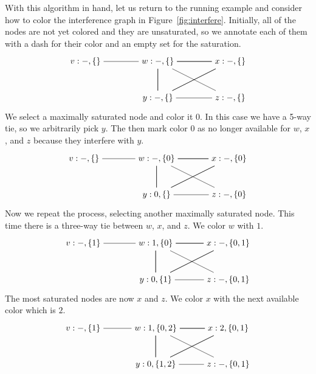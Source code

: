 \documentclass[11pt]{book}
\begin{document}
With this algorithm in hand, let us return to the running example and
consider how to color the interference graph in
Figure~\ref{fig:interfere}. Initially, all of the nodes are not yet
colored and they are unsaturated, so we annotate each of them with a
dash for their color and an empty set for the saturation.
\[
\begin{tikzpicture}[baseline=(current  bounding  box.center)]
\node (v) at (0,0)    {$v:-,\{\}$};
\node (w) at (3,0)    {$w:-,\{\}$};
\node (x) at (6,0)    {$x:-,\{\}$};
\node (y) at (3,-1.5) {$y:-,\{\}$};
\node (z) at (6,-1.5) {$z:-,\{\}$};
\draw (v) to (w);
\foreach \i in {w,x,y} 
{
  \foreach \j in {w,x,y}
  { 
    \draw (\i) to (\j);
  }
}
\draw (z) to (w);
\draw (z) to (y);
\end{tikzpicture}
\]
We select a maximally saturated node and color it $0$. In this case we
have a 5-way tie, so we arbitrarily pick $y$. The then mark color $0$
as no longer available for $w$, $x$, and $z$ because they interfere
with $y$.
\[
\begin{tikzpicture}[baseline=(current  bounding  box.center)]
\node (v) at (0,0)    {$v:-,\{\}$};
\node (w) at (3,0)    {$w:-,\{0\}$};
\node (x) at (6,0)    {$x:-,\{0\}$};
\node (y) at (3,-1.5) {$y:0,\{\}$};
\node (z) at (6,-1.5) {$z:-,\{0\}$};
\draw (v) to (w);
\foreach \i in {w,x,y} 
{
  \foreach \j in {w,x,y}
  { 
    \draw (\i) to (\j);
  }
}
\draw (z) to (w);
\draw (z) to (y);
\end{tikzpicture}
\]
Now we repeat the process, selecting another maximally saturated node.
This time there is a three-way tie between $w$, $x$, and $z$. We color
$w$ with $1$.
\[
\begin{tikzpicture}[baseline=(current  bounding  box.center)]
\node (v) at (0,0)    {$v:-,\{1\}$};
\node (w) at (3,0)    {$w:1,\{0\}$};
\node (x) at (6,0)    {$x:-,\{0,1\}$};
\node (y) at (3,-1.5) {$y:0,\{1\}$};
\node (z) at (6,-1.5) {$z:-,\{0,1\}$};
\draw (v) to (w);
\foreach \i in {w,x,y} 
{
  \foreach \j in {w,x,y}
  { 
    \draw (\i) to (\j);
  }
}
\draw (z) to (w);
\draw (z) to (y);
\end{tikzpicture}
\]
The most saturated nodes are now $x$ and $z$. We color $x$ with the
next available color which is $2$.
\[
\begin{tikzpicture}[baseline=(current  bounding  box.center)]
\node (v) at (0,0)    {$v:-,\{1\}$};
\node (w) at (3,0)    {$w:1,\{0,2\}$};
\node (x) at (6,0)    {$x:2,\{0,1\}$};
\node (y) at (3,-1.5) {$y:0,\{1,2\}$};
\node (z) at (6,-1.5) {$z:-,\{0,1\}$};
\draw (v) to (w);
\foreach \i in {w,x,y} 
{
  \foreach \j in {w,x,y}
  { 
    \draw (\i) to (\j);
  }
}
\draw (z) to (w);
\draw (z) to (y);
\end{tikzpicture}
\]
\end{document}
